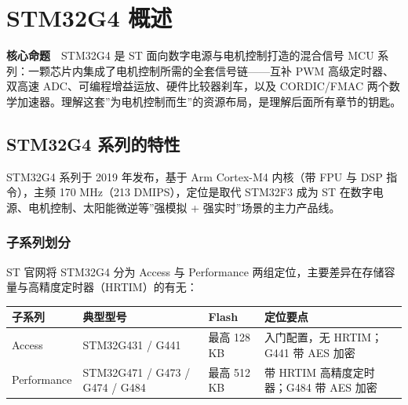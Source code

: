 \documentclass[
  UTF8,
  scheme=plain,
  fontsize=10pt,
  openany
]{ctexbook}
\begin{document}
\clearpage

\chapter{STM32G4 概述}\label{stm32g4-ux6982ux8ff0}

\begin{epigraph}

\textbf{核心命题}　STM32G4 是 ST 面向数字电源与电机控制打造的混合信号
MCU 系列：一颗芯片内集成了电机控制所需的全套信号链------互补 PWM
高级定时器、双高速 ADC、可编程增益运放、硬件比较器刹车，以及 CORDIC/FMAC
两个数学加速器。理解这套''为电机控制而生''的资源布局，是理解后面所有章节的钥匙。

\end{epigraph}

\section{STM32G4
系列的特性}\label{stm32g4-ux7cfbux5217ux7684ux7279ux6027}

STM32G4 系列于 2019 年发布，基于 Arm Cortex-M4 内核（带 FPU 与 DSP
指令），主频 170 MHz（213 DMIPS），定位是取代 STM32F3 成为 ST
在数字电源、电机控制、太阳能微逆等''强模拟 + 强实时''场景的主力产品线。

\subsection{子系列划分}\label{ux5b50ux7cfbux5217ux5212ux5206}

ST 官网将 STM32G4 分为 Access 与 Performance
两组定位，主要差异在存储容量与高精度定时器（HRTIM）的有无：

{\def\LTcaptype{none} %
\begin{longtable}[]{@{}
  >{\raggedright\arraybackslash}p{}
  >{\raggedright\arraybackslash}p{}
  >{\raggedright\arraybackslash}p{}
  >{\raggedright\arraybackslash}p{}@{}}
\toprule\noalign{}
\begin{minipage}[b]{\linewidth}\raggedright
子系列
\end{minipage} & \begin{minipage}[b]{\linewidth}\raggedright
典型型号
\end{minipage} & \begin{minipage}[b]{\linewidth}\raggedright
Flash
\end{minipage} & \begin{minipage}[b]{\linewidth}\raggedright
定位要点
\end{minipage} \\
\midrule\noalign{}
\endhead
\bottomrule\noalign{}
\endlastfoot
Access & STM32G431 / G441 & 最高 128 KB & 入门配置，无 HRTIM；G441 带
AES 加密 \\
Performance & STM32G471 / G473 / G474 / G484 & 最高 512 KB & 带 HRTIM
高精度定时器；G484 带 AES 加密 \\
\end{longtable}
}
\end{document}
